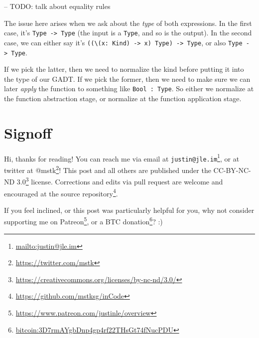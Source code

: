 \documentclass[]{article}
\renewcommand{\href}[2]{#2\footnote{\url{#1}}}
\begin{document}
-- TODO: talk about equality rules

The issue here arises when we ask about the \emph{type} of both expressions. In
the first case, it's \texttt{Type\ -\textgreater{}\ Type} (the input is a
\texttt{Type}, and so is the output). In the second case, we can either say it's
\texttt{((\textbackslash{}(x:\ Kind)\ -\textgreater{}\ x)\ Type)\ -\textgreater{}\ Type},
or also \texttt{Type\ -\textgreater{}\ Type}.

If we pick the latter, then we need to normalize the kind before putting it into
the type of our GADT. If we pick the former, then we need to make sure we can
later \emph{apply} the function to something like \texttt{Bool\ :\ Type}. So
either we normalize at the function abstraction stage, or normalize at the
function application stage.

\hypertarget{signoff}{%
\section{Signoff}\label{signoff}}

Hi, thanks for reading! You can reach me via email at
\href{mailto:justin@jle.im}{\nolinkurl{justin@jle.im}}, or at twitter at
\href{https://twitter.com/mstk}{@mstk}! This post and all others are published
under the \href{https://creativecommons.org/licenses/by-nc-nd/3.0/}{CC-BY-NC-ND
3.0} license. Corrections and edits via pull request are welcome and encouraged
at \href{https://github.com/mstksg/inCode}{the source repository}.

If you feel inclined, or this post was particularly helpful for you, why not
consider \href{https://www.patreon.com/justinle/overview}{supporting me on
Patreon}, or a \href{bitcoin:3D7rmAYgbDnp4gp4rf22THsGt74fNucPDU}{BTC donation}?
:)
\end{document}
